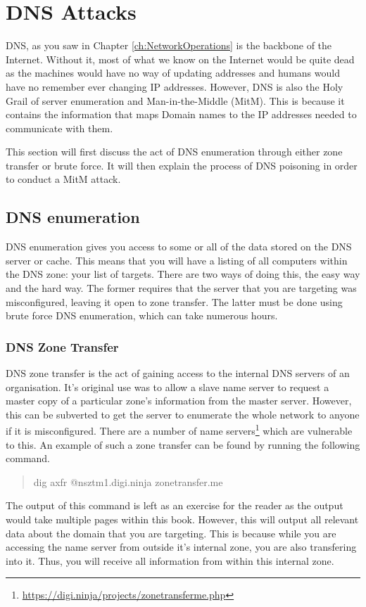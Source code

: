 \documentclass[a4paper,11pt]{report}
\begin{document}
	\section{DNS Attacks}
		DNS, as you saw in Chapter \ref{ch:NetworkOperations} is the backbone of the Internet. 
		Without it, most of what we know on the Internet would be quite dead as the machines would have no way of updating addresses and humans would have no remember ever changing IP addresses. 
		However, DNS is also the Holy Grail of server enumeration and Man-in-the-Middle (MitM).
		This is because it contains the information that maps Domain names to the IP addresses needed to communicate with them. 

		This section will first discuss the act of DNS enumeration through either zone transfer or brute force. 
		It will then explain the process of DNS poisoning in order to conduct a MitM attack. 

		\subsection{DNS enumeration}
			DNS enumeration gives you access to some or all of the data stored on the DNS server or cache. 
			This means that you will have a listing of all computers within the DNS zone: your list of targets. 
			There are two ways of doing this, the easy way and the hard way. 
			The former requires that the server that you are targeting was misconfigured, leaving it open to zone transfer. 
			The latter must be done using brute force DNS enumeration, which can take numerous hours. 

			\subsubsection{DNS Zone Transfer}
				DNS zone transfer is the act of gaining access to the internal DNS servers of an organisation. 
				It's original use was to allow a slave name server to request a master copy of a particular zone's information from the master server. 
				However, this can be subverted to get the server to enumerate the whole network to anyone if it is misconfigured. 
				There are a number of name servers\footnote{\url{https://digi.ninja/projects/zonetransferme.php}} which are vulnerable to this. 
				An example of such a zone transfer can be found by running the following command. 
				\begin{quote}
					dig axfr @nsztm1.digi.ninja zonetransfer.me
				\end{quote}
				The output of this command is left as an exercise for the reader as the output would take multiple pages within this book. 
				However, this will output all relevant data about the domain that you are targeting. 
				This is because while you are accessing the name server from outside it's internal zone, you are also transfering into it. 
				Thus, you will receive all information from within this internal zone. 
\end{document}
